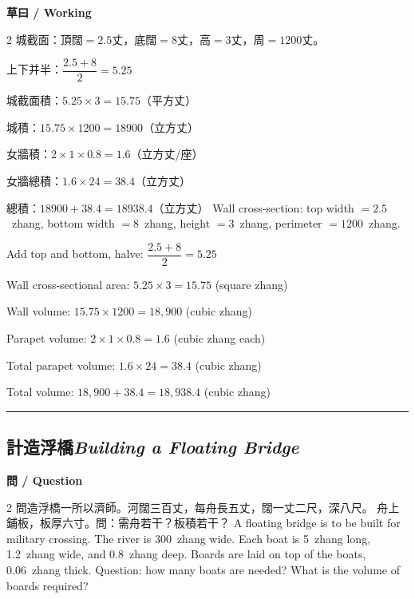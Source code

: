 \documentclass[11pt,a4paper]{article}
\newcommand{\bilingualsubsection}[2]{\subsection{#1\quad\textit{#2}}}
\newcommand{\longline}{\noindent\rule{\textwidth}{0.4pt}}
\begin{document}
\vspace{0.4em}
\noindent\textbf{\textcolor{chinesecolor}{草曰} / \textcolor{englishcolor}{Working}}
\vspace{0.2em}
\begin{paracol}{2}
城截面：頂闊$=2.5$丈，底闊$=8$丈，高$=3$丈，周$=1200$丈。

上下并半：$\dfrac{2.5+8}{2} = 5.25$

城截面積：$5.25 \times 3 = 15.75$（平方丈）

城積：$15.75 \times 1200 = 18900$（立方丈）

女牆積：$2 \times 1 \times 0.8 = 1.6$（立方丈/座）

女牆總積：$1.6 \times 24 = 38.4$（立方丈）

總積：$18900 + 38.4 = 18938.4$（立方丈）
\switchcolumn
Wall cross-section: top width $= 2.5$~zhang, bottom width $= 8$~zhang,
height $= 3$~zhang, perimeter $= 1200$~zhang.

Add top and bottom, halve: $\dfrac{2.5+8}{2} = 5.25$

Wall cross-sectional area: $5.25 \times 3 = 15.75$ (square zhang)

Wall volume: $15.75 \times 1200 = 18{,}900$ (cubic zhang)

Parapet volume: $2 \times 1 \times 0.8 = 1.6$ (cubic zhang each)

Total parapet volume: $1.6 \times 24 = 38.4$ (cubic zhang)

Total volume: $18{,}900 + 38.4 = 18{,}938.4$ (cubic zhang)
\end{paracol}

\vspace{0.5em}
\longline

\bilingualsubsection{計造浮橋}{Building a Floating Bridge}

\vspace{0.4em}
\noindent\textbf{\textcolor{chinesecolor}{問} / \textcolor{englishcolor}{Question}}
\vspace{0.3em}
\begin{paracol}{2}
問造浮橋一所以濟師。河闊三百丈，每舟長五丈，闊一丈二尺，深八尺。
舟上鋪板，板厚六寸。問：需舟若干？板積若干？
\switchcolumn
A floating bridge is to be built for military crossing. The river is
300~zhang wide. Each boat is 5~zhang long, 1.2~zhang wide, and 0.8~zhang
deep. Boards are laid on top of the boats, 0.06~zhang thick. Question:
how many boats are needed? What is the volume of boards required?
\end{paracol}
\end{document}
